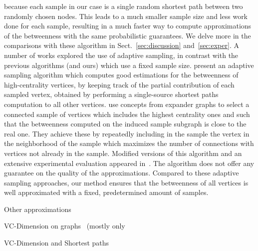 because each sample in our case is a single random shortest path between two
randomly chosen nodes. This leads to a much smaller sample size and less work
done for each sample, resulting in a much faster way to compute approximations
of the betweenness with the same probabilistic guarantees. We delve more in the
comparisons with these algorithm in Sect.~\ref{sec:discussion}
and~\ref{sec:exper}.
A number of works explored the use of adaptive sampling, in contrast with the
previous algorithms (and ours) which use a fixed sample size. \citet{BaderKMM07}
present an adaptive sampling algorithm which computes good estimations for the
betweenness of high-centrality vertices, by keeping track of the partial
contribution of each sampled vertex, obtained by performing a single-source
shortest paths computation to all other vertices. \citet{MaiyaBW10} use concepts
from expander graphs to select a connected sample of vertices which includes the
highest centrality ones and such that the betweenness computed on the induced
sample subgraph is close to the real one. They achieve these by repeatedly
including in the sample the vertex in the neighborhood of the sample which
maximizes the number of connections with vertices not already in the sample.
Modified versions of this algorithm and an extensive experimental evaluation
appeared in~\citep{LimMRTB11}. The algorithm does not offer any guarantee on the
quality of the approximations. Compared to these adaptive sampling approaches,
our method ensures that the betweenness of all vertices is well approximated
with a fixed, predetermined amount of samples.

Other approximations~\citep{GkorouPE10,PrountzosP13,SaryuceSKC13}

VC-Dimension on graphs~\citep{AnthonyBC95,KranakisKRUW97,MubayiZ07,YcartR07}
(mostly only~\citep{KranakisKRUW97}

VC-Dimension and Shortest paths~\citep{AbrahamDFGW11}

